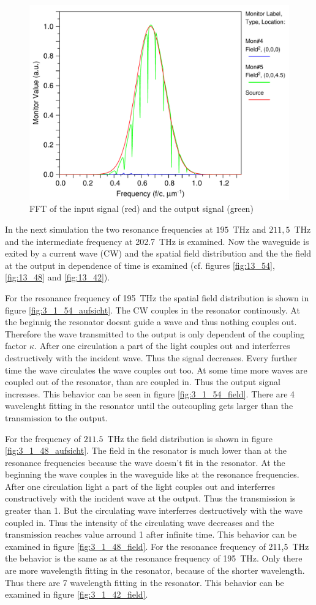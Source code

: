 \begin{figure}
\centering
\includegraphics[width=.6\columnwidth]{Grafiken/12_TE_FFT.pdf}%
\caption{FFT of the input signal (red) and the output signal (green)}%
\label{fig:2_TE_FFT}%
\end{figure}



\newpage
In the next simulation the two resonance frequencies at $195$~THz and $211,5$~THz and the intermediate frequency at 202.7~THz is examined. Now the waveguide is exited by a current wave (CW) and the spatial field distribution and the the field at the output in dependence of time is examined (cf. figures \ref{fig:13_54}, \ref{fig:13_48} and \ref{fig:13_42}).

For the resonance frequency of 195~THz the spatial field distribution is shown in figure \ref{fig:3_1_54_aufsicht}. The CW couples in the resonator continously. At the beginnig the resonator doesnt guide a wave and thus nothing couples out. Therefore the wave transmitted to the output is only dependent of the coupling factor $\kappa$. After one circulation a part of the light couples out and interferres destructively with the incident wave. Thus the signal decreases. Every further time the wave circulates the wave couples out too. At some time more waves are coupled out of the resonator, than are coupled in. Thus the output signal increases. This behavior can be seen in figure \ref{fig:3_1_54_field}. There are 4 wavelenght fitting in the resonator until the outcoupling gets larger than the transmission to the output. 

For the frequency of $211.5$~THz the field distribution is shown in figure \ref{fig:3_1_48_aufsicht}. The field in the resonator is much lower than at the resonance frequencies because the wave doesn't fit in the resonator. At the beginning the wave couples in the waveguide like at the resonance frequencies. After one circulation light a part of the light couples out and interferres constructively with the incident wave at the output. Thus the transmission is greater than 1. But the circulating wave interferres destructively with the wave coupled in. Thus the intensity of the circulating wave decreases and the transmission reaches value arround 1 after infinite time. This behavior can be examined in figure \ref{fig:3_1_48_field}.
\newpage
For the resonance frequency of 211,5~THz the behavior is the same as at the resonance frequency of 195~THz. Only there are more wavelength fitting in the resonator, because of the shorter wavelength. Thus there are 7 wavelength fitting in the resonator. This behavior can be examined in figure \ref{fig:3_1_42_field}.

